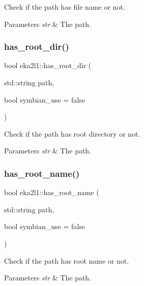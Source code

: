 Check if the path has file name or not. 


\begin{DoxyParams}{Parameters}
{\em str} & The path. \\
\hline
\end{DoxyParams}
\mbox{\label{namespaceeka2l1_a898023654cdb1beee83a05f139dc9b18}} 
\subsubsection{\texorpdfstring{has\+\_\+root\+\_\+dir()}{has\_root\_dir()}}
{\footnotesize\ttfamily bool eka2l1\+::has\+\_\+root\+\_\+dir (\begin{DoxyParamCaption}\item[{std\+::string}]{path,  }\item[{bool}]{symbian\+\_\+use = {\ttfamily false} }\end{DoxyParamCaption})}



Check if the path has root directory or not. 


\begin{DoxyParams}{Parameters}
{\em str} & The path. \\
\hline
\end{DoxyParams}
\mbox{\label{namespaceeka2l1_a380aae3ddef8d345a83d266e4feb21ba}} 
\subsubsection{\texorpdfstring{has\+\_\+root\+\_\+name()}{has\_root\_name()}}
{\footnotesize\ttfamily bool eka2l1\+::has\+\_\+root\+\_\+name (\begin{DoxyParamCaption}\item[{std\+::string}]{path,  }\item[{bool}]{symbian\+\_\+use = {\ttfamily false} }\end{DoxyParamCaption})}



Check if the path has root name or not. 


\begin{DoxyParams}{Parameters}
{\em str} & The path. \\
\hline
\end{DoxyParams}
\mbox{\label{namespaceeka2l1_ac9756b37f4c2a3647cc168f5fe37c498}} 
